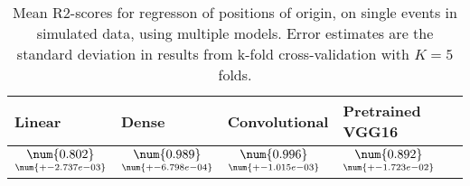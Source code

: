 \begin{table}
\centering
\caption{
Mean R2-scores for regresson of positions of origin, on single events in simulated data, using multiple models. 
Error estimates are the standard deviation in results from k-fold cross-validation 
with $K=5$ folds.
}
\label{tab:regression-simulated-single-position-pixelmod-r2}
\begin{tabular}{llll}
\toprule
                                             Linear &                                               Dense &                                       Convolutional &                                    Pretrained VGG16 \\
\midrule
 $\underset{\num{+- 2.737e-03 }  }{\num{ 0.802 } }$ &  $\underset{\num{+- 6.798e-04 }  }{\num{ 0.989 } }$ &  $\underset{\num{+- 1.015e-03 }  }{\num{ 0.996 } }$ &  $\underset{\num{+- 1.723e-02 }  }{\num{ 0.892 } }$ \\
\bottomrule
\end{tabular}
\end{table}
